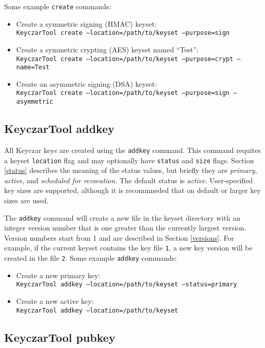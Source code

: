 \documentclass{llncs}
\begin{document}
Some example {\tt create} commands:
\begin{itemize}
\item Create a symmetric signing (HMAC) keyset: \\
{\tt KeyczarTool create --location=/path/to/keyset --purpose=sign}
\item Create a symmetric crypting (AES) keyset named ``Test'': \\
{\tt KeyczarTool create --location=/path/to/keyset --purpose=crypt --name=Test}
\item Create an asymmetric signing (DSA) keyset: \\
{\tt KeyczarTool create --location=/path/to/keyset --purpose=sign --asymmetric} 
\end{itemize}

\subsection{KeyczarTool addkey}

All Keyczar keys are created using the {\tt addkey} command. This command
requites a keyset {\tt location} flag and may optionally have {\tt status} and
{\tt size} flags. Section \ref{status} describes the meaning of the status
values, but briefly they are {\it primary}, {\it active}, and {\it
scheduled for revocation}. The default status is {\it active}. User-specified
key sizes are supported, although it is recommneded that on default or larger
key  sizes are used.

The {\tt addkey} command will create a new file in the keyset directory with an
integer version number that is one greater than the currently largest version.
Version numbers start from 1 and are described in Section \ref{versions}. For
example, if the current keyset contains the key file {\tt 1}, a new key version
will be created in the file {\tt 2}. Some example {\tt addkey} commands:
\begin{itemize}
\item Create a new primary key: \\
{\tt KeyczarTool addkey --location=/path/to/keyset --status=primary}
\item Create a new active key: \\
{\tt KeyczarTool addkey --location=/path/to/keyset} 
\end{itemize}

\subsection{KeyczarTool pubkey}
\end{document}
